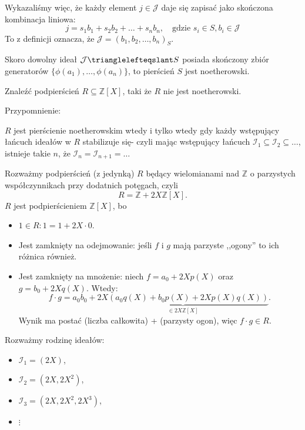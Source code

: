 \begin{solution}
    Wykazaliśmy więc, że każdy element $j \in \mathcal{J}$ daje się zapisać jako skończona kombinacja liniowa:
    \[
    j = s_1 b_1 + s_2 b_2 + \dots + s_n b_n, \quad \text{gdzie } s_i \in S, b_i \in \mathcal{J}
    \]
    To z definicji oznacza, że $\mathcal{J} = (b_1, b_2, \dots, b_n)_S$. 
    
    Skoro dowolny ideał $\mathcal{J} \trianglelefteqslant S$ posiada skończony zbiór generatorów $\{\phi(a_1), \dots, \phi(a_n)\}$, to pierścień $S$ jest noetherowski.
\end{solution} 
\begin{problem}[2]
	Znaleźć podpierścień $R \subseteq \mathbb{Z} \left[ X \right]$, taki że $R$ nie jest noetherowski.
\end{problem} 
\begin{solution}
	Przypomnienie:
	\begin{note}
	
		$R$ jest pierścienie noetherowskim wtedy i tylko wtedy gdy każdy wstępujący łańcuch ideałów w $R$ stabilizuje się- czyli mając wstępujący łańcuch $\mathcal{I}_{1} \subseteq \mathcal{I}_{2} \subseteq \ldots$, istnieje takie $n$, że $\mathcal{I}_{n} = \mathcal{I}_{n+1} = \ldots$
	\end{note}
	Rozważmy podpierścień (z jedynką) $R$ będący wielomianami nad $\mathbb{Z} $ o parzystych współczynnikach przy dodatnich potęgach, czyli
	\[
	R = \mathbb{Z} + 2X\mathbb{Z}\left[ X \right] 
	.\] 
	$R$ jest podpierścieniem $\mathbb{Z} \left[ X \right] $, bo
	\begin{itemize}
		\item $1 \in R: 1 = 1 + 2X \cdot 0$.
		\item Jest zamknięty na odejmowanie: jeśli $f$ i $g$ mają parzyste ,,ogony'' to ich różnica również.
		\item Jest zamknięty na mnożenie: niech $f = a_0 + 2Xp\left( X \right) $ oraz $g = b_0 + 2Xq\left( X \right) $. Wtedy:
			\[
			f\cdot g = a_0b_0 + \underbrace{2X\left( a_0q\left( X \right) + b_0p\left( X \right) + 2Xp\left( X \right) q\left( X \right)  \right) }_{\in 2X\mathbb{Z} \left[ X \right] }
			.\] 
		Wynik ma postać (liczba całkowita) + (parzysty ogon), więc $f\cdot g\in R$.
	\end{itemize}
	
	Rozważmy rodzinę ideałów:
	\begin{itemize}
		\item $\mathcal{I}_{1} = \left( 2X \right) $,
		\item $\mathcal{I}_{2} = \left( 2X, 2X^2 \right) $,
		\item $\mathcal{I}_{3} = \left( 2X, 2X^2, 2X^3 \right) $,
		\item $\vdots$
	\end{itemize}


\end{solution}
